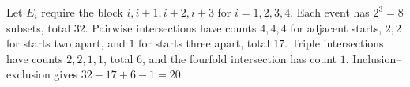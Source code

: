 Let $E_i$ require the block $i,i+1,i+2,i+3$ for $i=1,2,3,4$. Each event has $2^3=8$ subsets, total $32$. Pairwise intersections have counts $4,4,4$ for adjacent starts, $2,2$ for starts two apart, and $1$ for starts three apart, total $17$. Triple intersections have counts $2,2,1,1$, total $6$, and the fourfold intersection has count $1$. Inclusion--exclusion gives $\boxed{32-17+6-1=20}$.

